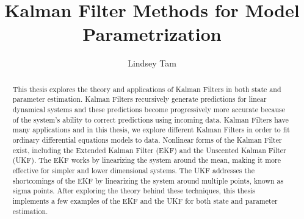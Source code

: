 \documentclass{pom_thesis}
\title{Kalman Filter Methods for Model Parametrization}
\author{Lindsey Tam }
\begin{document}
\maketitle

\begin{abstract}
	This thesis explores the theory and applications of Kalman Filters in both state and parameter estimation. Kalman Filters recursively generate predictions for linear dynamical systems and these predictions become progressively more accurate because of the system's ability to correct predictions using incoming data. Kalman Filters have many applications and in this thesis, we explore different Kalman Filters in order to fit ordinary differential equations models to data. Nonlinear forms of the Kalman Filter exist, including the Extended Kalman Filter (EKF) and the Unscented Kalman Filter (UKF). The EKF works by linearizing the system around the mean, making it more effective for simpler and lower dimensional systems. The UKF addresses the shortcomings of the EKF by linearizing the system around multiple points, known as sigma points. After exploring the theory behind these techniques, this thesis implements a few examples of the EKF and the UKF for both state and parameter estimation. \end{abstract}

\tableofcontents























\appendix

\end{document}

